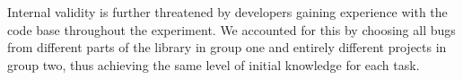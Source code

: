 Internal validity is further threatened by developers gaining experience with the code base throughout the experiment.
We accounted for this by choosing all bugs from different parts of the library in group one and entirely different projects in group two, thus achieving the same level of initial knowledge for each task.


%
%
%
%
%
%
